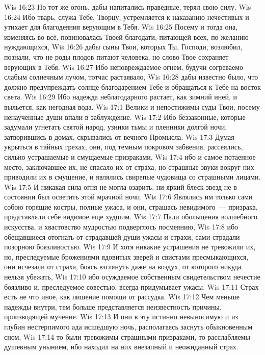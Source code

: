 \vs Wis 16:23 Но тот же огонь, дабы напитались праведные, терял свою силу.
\vs Wis 16:24 Ибо тварь, служа Тебе, Творцу, устремляется к наказанию нечестивых и утихает для благодеяния верующим в Тебя.
\vs Wis 16:25 Посему и тогда она, изменяясь во всё, повиновалась Твоей благодати, питающей всех, по желанию нуждающихся,
\vs Wis 16:26 дабы сыны Твои, которых Ты, Господи, возлюбил, познали, что не роды плодов питают человека, но слово Твое сохраняет верующих в Тебя.
\vs Wis 16:27 Ибо неповреждаемое огнем, будучи согреваемо слабым солнечным лучом, тотчас растаявало,
\vs Wis 16:28 дабы известно было, что должно предупреждать солнце благодарением Тебе и обращаться к Тебе на восток света.
\vs Wis 16:29 Ибо надежда неблагодарного растает, как зимний иней, и выльется, как негодная вода.
\vs Wis 17:1 Велики и непостижимы суды Твои, посему ненаученные души впали в заблуждение.
\vs Wis 17:2 Ибо беззаконные, которые задумали угнетать святой народ, узники тьмы и пленники долгой ночи, затворившись в домах, скрывались от вечного Промысла.
\vs Wis 17:3 Думая укрыться в тайных грехах, они, под темным покровом забвения, рассеялись, сильно устрашаемые и смущаемые призраками,
\vs Wis 17:4 ибо и самое потаенное место, заключавшее их, не спасало их от страха, но страшные звуки вокруг них приводили их в смущение, и являлись свирепые чудовища со страшными лицами.
\vs Wis 17:5 И никакая сила огня не могла озарить, ни яркий блеск звезд не в состоянии был осветить этой мрачной ночи.
\vs Wis 17:6 Являлись им только сами собою горящие костры, полные ужаса, и они, страшась невидимого~--- призрака, представляли себе видимое еще худшим.
\vs Wis 17:7 Пали обольщения волшебного искусства, и хвастовство мудростью подверглось посмеянию,
\vs Wis 17:8 ибо обещавшиеся отогнать от страдавшей души ужасы и страхи, сами страдали позорною боязливостью.
\vs Wis 17:9 И хотя никакие устрашения не тревожили их, но, преследуемые брожениями ядовитых зверей и свистами пресмыкающихся, они исчезали от страха, боясь взглянуть даже на воздух, от которого никуда нельзя убежать,
\vs Wis 17:10 ибо осуждаемое собственным свидетельством нечестие боязливо и, преследуемое совестью, всегда придумывает ужасы.
\vs Wis 17:11 Страх есть не что иное, как лишение помощи от рассудка.
\vs Wis 17:12 Чем меньше надежды внутри, тем больше представляется неизвестность причины, производящей мучение.
\vs Wis 17:13 И они в эту истинно невыносимую и из глубин нестерпимого ада исшедшую ночь, располагаясь заснуть обыкновенным сном,
\vs Wis 17:14 то были тревожимы страшными призраками, то расслабляемы душевным унынием, ибо находил на них внезапный и неожиданный страх.
